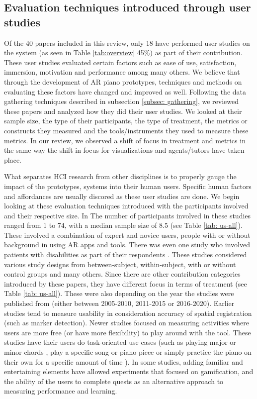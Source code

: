 \documentclass[manuscript,screen]{acmart}
\begin{document}
\subsection{Evaluation techniques introduced through user studies}
\label{subsec: eval}

Of the 40 papers included in this review, only 18 have performed user studies on the system (as seen in Table \ref{tab:overview} 45\%) as part of their contribution. These user studies evaluated certain factors such as ease of use, satisfaction, immersion, motivation and performance among many others. We believe that through the development of AR piano prototypes, techniques and methods on evaluating these factors have changed and improved as well. Following the data gathering techniques described in subsection \ref{subsec: gathering}, we reviewed these papers and analyzed how they did their user studies. We looked at their sample size, the type of their participants, the type of treatment, the metrics or constructs they measured and the tools/instruments they used to measure these metrics. In our review, we observed a shift of focus in treatment and metrics in the same way the shift in focus for visualizations and agents/tutors have taken place. 

What separates HCI research from other disciplines is to properly gauge the impact of the prototypes, systems into their human users. Specific human factors and affordances are usually discored as these user studies are done. We begin looking at these evaluation techniques introduced with the participants involved and their respective size. In The number of participants involved in these studies ranged from 1 to 74, with a median sample size of 8.5 (see Table \ref{tab: us-all}). These involved a combination of expert and novice users, people with or without background in using AR apps and tools. There was even one study who involved patients with disabilities as part of their respondents \cite{correa2009computer}. These studies considered various study designs from between-subject, within-subject, with or without control groups and many others. Since there are other contribution categories introduced by these papers, they have different focus in terms of treatment (see Table \ref{tab: us-all}). These were also depending on the year the studies were published from (either between 2005-2010, 2011-2015 or 2016-2020). Earlier studies tend to measure usability in consideration accuracy of spatial registration (such as marker detection). Newer studies focused on measuring activities where users are more free (or have more flexibility) to play around with the tool. These studies have their users do task-oriented use cases (such as playing major or minor chords \cite{nugraha2014pemanfaatan, xiao2010mirrorfugue}, play a specific song or piano piece \cite{chow2013music, sandnes2019enhanced,pan2018pilot} or simply practice the piano on their own for a specific amount of time \cite{weing2013piano, raymaekers2014game}). In some studies, adding familiar and entertaining elements have allowed experiments that focused on gamification, and the ability of the users to complete quests as an alternative approach to measuring performance and learning. 
\end{document}
